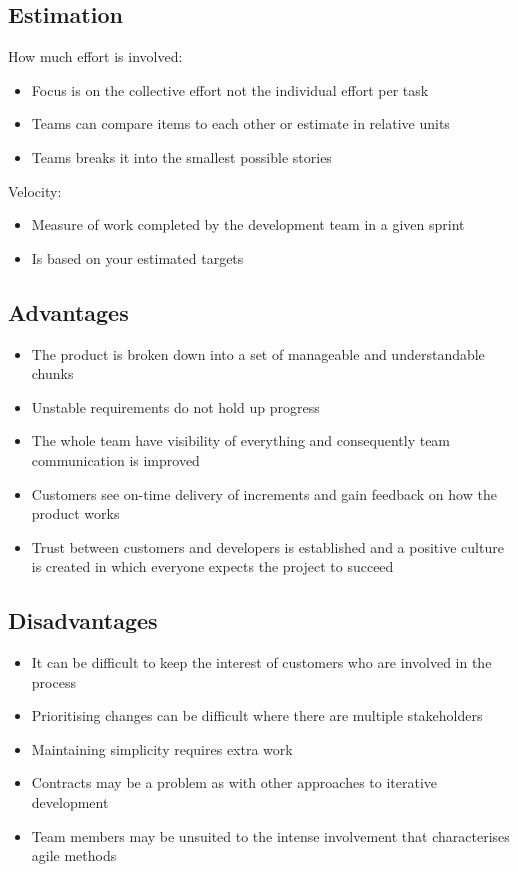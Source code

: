 \documentclass{article}[18pt]
\begin{document}
\subsection{Estimation}
How much effort is involved:
\begin{itemize}
	\item Focus is on the collective effort not the individual effort per task
	\item Teams can compare items to each other or estimate in relative units
	\item Teams breaks it into the smallest possible stories
\end{itemize}
Velocity:
\begin{itemize}
	\item Measure of work completed by the development team in a given sprint
	\item Is based on your estimated targets
\end{itemize}
\subsection{Advantages}
\begin{itemize}
	\item The product is broken down into a set of manageable and understandable chunks
	\item Unstable requirements do not hold up progress
	\item The whole team have visibility of everything and consequently team communication is improved
	\item Customers see on-time delivery of increments and gain feedback on how the product works
	\item Trust between customers and developers is established and a positive culture is created in which everyone expects the project to succeed
\end{itemize}
\subsection{Disadvantages}
\begin{itemize}
	\item It can be difficult to keep the interest of customers who are involved in the process
	\item Prioritising changes can be difficult where there are multiple stakeholders
	\item Maintaining simplicity requires extra work
	\item Contracts may be a problem as with other approaches to iterative development
	\item Team members may be unsuited to the intense involvement that characterises agile methods
\end{itemize}
\end{document}
